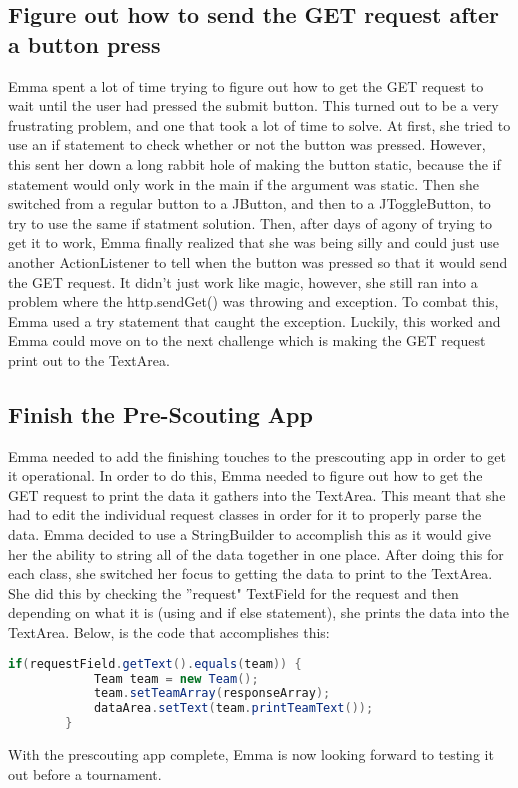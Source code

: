 \documentclass{article}
\begin{document}
\subsection{Figure out how to send the GET request after a button press}
Emma spent a lot of time trying to figure out how to get the GET request to wait until the user had pressed the submit button. This turned out to be a very frustrating problem, and one that took a lot of time to solve. At first, she tried to use an if statement to check whether or not the button was pressed. However, this sent her down a long rabbit hole of making the button static, because the if statement would only work in the main if the argument was static. Then she switched from a regular button to a JButton, and then to a JToggleButton, to try to use the same if statment solution. Then, after days of agony of trying to get it to work, Emma finally realized that she was being silly and could just use another ActionListener to tell when the button was pressed so that it would send the GET request. It didn't just work like magic, however, she still ran into a problem where the http.sendGet() was throwing and exception. To combat this, Emma used a try statement that caught the exception. Luckily, this worked and Emma could move on to the next challenge which is making the GET request print out to the TextArea.

\subsection{Finish the Pre-Scouting App}
Emma needed to add the finishing touches to the prescouting app in order to get it operational. In order to do this, Emma needed to figure out how to get the GET request to print the data it gathers into the TextArea. This meant that she had to edit the individual request classes in order for it to properly parse the data. Emma decided to use a StringBuilder to accomplish this as it would give her the ability to string all of the data together in one place. After doing this for each class, she switched her focus to getting the data to print to the TextArea. She did this by checking the ''request" TextField for the request and then depending on what it is (using and if else statement), she prints the data into the TextArea. Below, is the code that accomplishes this: \\

\begin{lstlisting}[language=Java]
       if(requestField.getText().equals(team)) {
            Team team = new Team();
            team.setTeamArray(responseArray);
            dataArea.setText(team.printTeamText());
        } 
\end{lstlisting}

With the prescouting app complete, Emma is now looking forward to testing it out before a tournament. 
\end{document}
